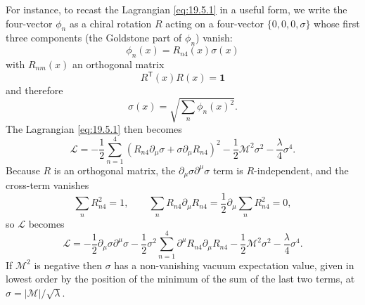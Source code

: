 For instance, to recast the Lagrangian \eqref{eq:19.5.1} in a useful form, we write the four-vector $\phi_n$ as a chiral rotation $R$ acting on a four-vector $\{0,0,0,\sigma\}$ whose first three components (the Goldstone part of $\phi_n$) vanish:
\begin{equation}
\phi_n(x)=R_{n4}(x)\sigma(x)
\tag{19.5.2}\label{eq:19.5.2}
\end{equation}
with $R_{nm}(x)$ an orthogonal matrix
\begin{equation}
R^{\mathsf T}(x)R(x)=\mathbf{1}
\tag{19.5.3}\label{eq:19.5.3}
\end{equation}
and therefore
\begin{equation}
\sigma(x)=\sqrt{\sum_n\phi_n(x)^2}.
\tag{19.5.4}\label{eq:19.5.4}
\end{equation}
The Lagrangian \eqref{eq:19.5.1} then becomes
\begin{equation}
\mathcal L
=-\frac{1}{2}\sum_{n=1}^4
\left(R_{n4}\partial_\mu\sigma+\sigma\partial_\mu R_{n4}\right)^2
-\frac{1}{2}\mathcal M^2\sigma^2-\frac{\lambda}{4}\sigma^4.
\tag{19.5.5}\label{eq:19.5.5}
\end{equation}
Because $R$ is an orthogonal matrix, the $\partial_\mu\sigma\partial^\mu\sigma$ term is $R$-independent, and the cross-term vanishes
\[
\sum_nR_{n4}^2=1,\qquad
\sum_nR_{n4}\partial_\mu R_{n4}
=\frac{1}{2}\partial_\mu\sum_nR_{n4}^2=0,
\]
so $\mathcal L$ becomes
\begin{equation}
\mathcal L
=-\frac{1}{2}\partial_\mu\sigma\partial^\mu\sigma
-\frac{1}{2}\sigma^2\sum_{n=1}^4
\partial^\mu R_{n4}\partial_\mu R_{n4}
-\frac{1}{2}\mathcal M^2\sigma^2-\frac{\lambda}{4}\sigma^4.
\tag{19.5.6}\label{eq:19.5.6}
\end{equation}
If $\mathcal M^2$ is negative then $\sigma$ has a non-vanishing vacuum expectation value, given in lowest order by the position of the minimum of the sum of the last two terms, at $\sigma=|\mathcal M|/\sqrt{\lambda}$.

